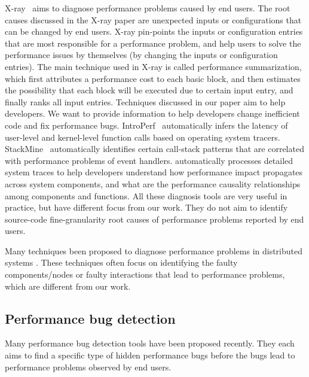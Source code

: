 X-ray~\cite{Attariyan:2012:XAR:2387880.2387910} aims to diagnose performance 
problems caused by end users. The root causes discussed in the X-ray paper are 
unexpected inputs or configurations that can be changed by end users. 
X-ray pin-points the inputs or configuration entries that are most 
responsible for a performance problem, and help users to solve the 
performance issues by themselves (by changing the inputs or configuration
entries). 
The main technique used in X-ray is called performance summarization, which 
first attributes a performance 
cost to each basic block, and then estimates the possibility that each block 
will be executed 
due to certain input entry, and finally ranks all input entries.
Techniques discussed in our paper aim to help developers. We want to provide 
information to help developers change inefficient code and fix performance bugs.
IntroPerf~\cite{IntroPerf} automatically infers the latency of user-level and
kernel-level function calls based on operating system tracers.
StackMine~\cite{Han:2012:PDL:2337223.2337241} automatically identifies certain
call-stack patterns that are correlated with performance problems of 
event handlers.
\citet{TaoAsplos2014} automatically processes detailed system traces to 
help developers understand how performance impact propagates across system
components, and what are the performance causality relationships among
components and functions.
All these diagnosis tools are very useful in practice, but have different
focus from our work. They
do not aim to identify source-code fine-granularity 
root causes of performance problems reported by end users.

Many techniques been proposed to diagnose 
performance problems in distributed systems
\cite{Sambasivan:2011:DPC:1972457.1972463,Fonseca:2010:ETC:1863133.1863143,Kasick:2010:BPD:1855511.1855515,Xu:2009:DLS:1629575.1629587,aguilera03}.
These techniques often focus on identifying the faulty components/nodes or 
faulty interactions that lead to performance problems, which are different from our work.

\subsection{Performance bug detection}
Many performance bug detection tools have been proposed recently.
They each aims to find a specific type of hidden
performance bugs before the bugs lead to performance problems observed by
end users.

